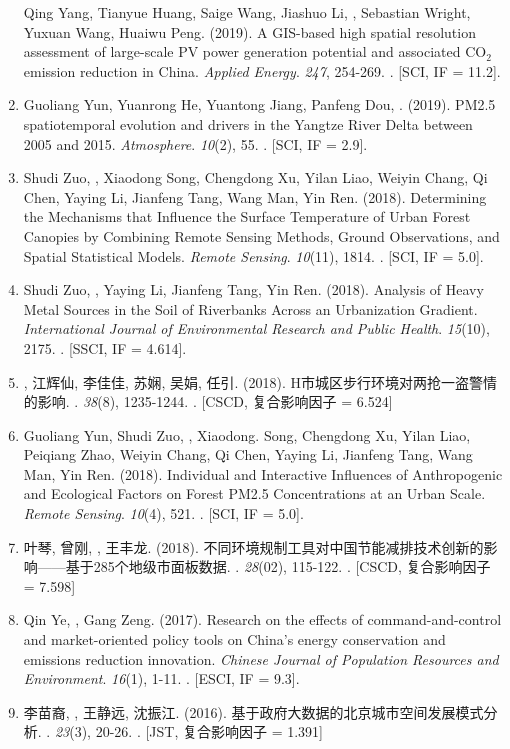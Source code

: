 \begin{enumerate}
    Qing Yang, Tianyue Huang, Saige Wang, Jiashuo Li, \Shaoqing, Sebastian Wright, Yuxuan Wang, Huaiwu Peng. (2019).
    A GIS-based high spatial resolution assessment of large-scale PV power generation potential and associated CO$_2$ emission reduction in China.
    \textit{Applied Energy}. \textit{247}, 254-269.
    . [SCI, IF = 11.2].
\item
    Guoliang Yun, Yuanrong He, Yuantong Jiang, Panfeng Dou, \Shaoqing. (2019).
    PM2.5 spatiotemporal evolution and drivers in the Yangtze River Delta between 2005 and 2015.
    \textit{Atmosphere}. \textit{10}(2), 55.
    . [SCI, IF = 2.9].
\item
    Shudi Zuo, \Shaoqing, Xiaodong Song, Chengdong Xu, Yilan Liao, Weiyin Chang, Qi Chen, Yaying Li, Jianfeng Tang, Wang Man, Yin Ren. (2018).
    Determining the Mechanisms that Influence the Surface Temperature of Urban Forest Canopies by Combining Remote Sensing Methods, Ground Observations, and Spatial Statistical Models. 
    \textit{Remote Sensing}. \textit{10}(11), 1814.
    . [SCI, IF = 5.0].
\item
    Shudi Zuo, \Shaoqing, Yaying Li, Jianfeng Tang, Yin Ren. (2018).
	Analysis of Heavy Metal Sources in the Soil of Riverbanks Across an Urbanization Gradient.
    \textit{International Journal of Environmental Research and Public Health}. \textit{15}(10), 2175.
    . [SSCI, IF = 4.614].
\item
    {}, 江辉仙, 李佳佳, 苏娴, 吴娟, 任引. (2018).
	H市城区步行环境对两抢一盗警情的影响.
    {}.  \textit{38}(8), 1235-1244.
    . [CSCD, 复合影响因子 = 6.524]
\item
    Guoliang Yun, Shudi Zuo, \Shaoqing, Xiaodong. Song, Chengdong Xu, Yilan Liao, Peiqiang Zhao, Weiyin Chang, Qi Chen, Yaying Li, Jianfeng Tang, Wang Man, Yin Ren. (2018).
	Individual and Interactive Influences of Anthropogenic and Ecological Factors on Forest PM2.5 Concentrations at an Urban Scale.
    \textit{Remote Sensing}. \textit{10}(4), 521.
    . [SCI, IF = 5.0].
\item
    叶琴, 曾刚, {}, 王丰龙. (2018).
	不同环境规制工具对中国节能减排技术创新的影响——基于285个地级市面板数据.
    {}. \textit{28}(02), 115-122.
    . [CSCD, 复合影响因子 = 7.598]
\item
    Qin Ye, \Shaoqing, Gang Zeng. (2017).
	Research on the effects of command-and-control and market-oriented policy tools on China’s energy conservation and emissions reduction innovation.
    \textit{Chinese Journal of Population Resources and Environment}. \textit{16}(1), 1-11.
    . [ESCI, IF = 9.3].
\item
   李苗裔, {}, 王静远, 沈振江. (2016).
	基于政府大数据的北京城市空间发展模式分析.
    {}. \textit{23}(3), 20-26.
    . [JST, 复合影响因子 = 1.391]
\end{enumerate}

